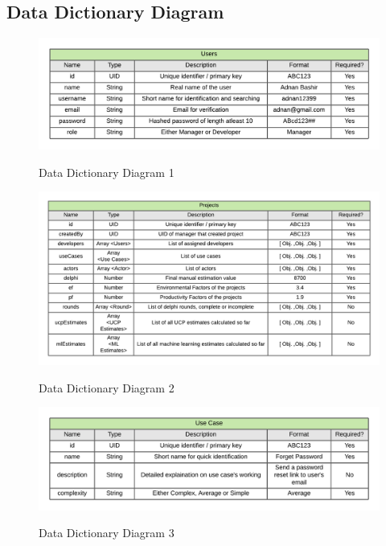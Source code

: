 
\subsection{Data Dictionary Diagram}


\begin{figure}[H]
    \centering
    \caption{Data Dictionary Diagram 1}
    \includegraphics[scale=0.7]{./diagrams/data-dictionary/dd-1.png}
    \label{fig:dd-diag-1}

\end{figure}


\begin{figure}[H]
    \centering
    \caption{Data Dictionary Diagram 2}
    \includegraphics[scale=0.7]{./diagrams/data-dictionary/dd-2.png}
    \label{fig:dd-diag-2}
\end{figure}


\begin{figure}[H]
    \centering
    \caption{Data Dictionary Diagram 3}
    \includegraphics[scale=0.7]{./diagrams/data-dictionary/dd-3.png}
    \label{fig:dd-diag-3}

\end{figure}


